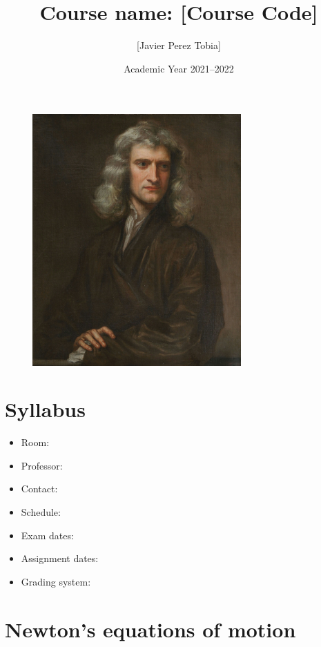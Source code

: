 \documentclass[10pt, oneside]{article}
\title{Course name: [Course Code]}
\author{[Javier Perez Tobia]}
\date{Academic Year 2021--2022}
\begin{document}
\maketitle

\begin{figure}[h]\label{fig:cover}
\includegraphics[width=8cm]{./images/newton1}  %
\centering
\end{figure}

\newpage

\tableofcontents

\newpage

\vspace{.25in}

\newpage
\section{Syllabus}\label{sec:syllabus}
\begin{itemize}
    \item Room:
    \item Professor:
    \item Contact:
    \item Schedule:
    \item Exam dates:
    \item Assignment dates:
    \item Grading system:
\end{itemize}

\newpage
\section{Newton's equations of motion}\label{sec:newton's-equations-of-motion}
\end{document}
